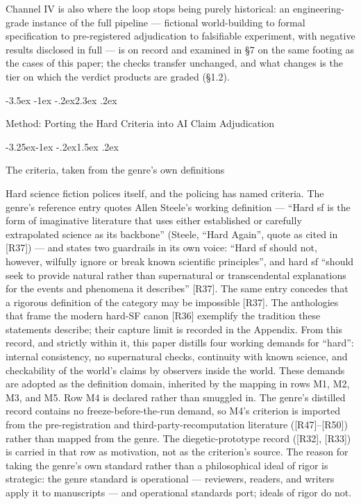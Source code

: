 \documentclass[11pt,a4paper]{article}
\makeatletter
\renewcommand\section{\@startsection{section}{1}{\z@}%
  {-3.5ex \@plus -1ex \@minus -.2ex}{2.3ex \@plus .2ex}%
  {\normalfont\Large\bfseries\raggedright}}
\renewcommand\subsection{\@startsection{subsection}{2}{\z@}%
  {-3.25ex\@plus -1ex \@minus -.2ex}{1.5ex \@plus .2ex}%
  {\normalfont\large\bfseries\raggedright}}
\makeatother
\begin{document}
Channel IV is also where the loop stops being purely historical: an engineering-grade instance of the full pipeline — fictional world-building to formal specification to pre-registered adjudication to falsifiable experiment, with negative results disclosed in full — is on record and examined in §7 on the same footing as the cases of this paper; the checks transfer unchanged, and what changes is the tier on which the verdict products are graded (§1.2).

\section{Method: Porting the Hard Criteria into AI Claim Adjudication}

\subsection{The criteria, taken from the genre's own definitions}

Hard science fiction polices itself, and the policing has named criteria. The genre's reference entry quotes Allen Steele's working definition — ``Hard sf is the form of imaginative literature that uses either established or carefully extrapolated science as its backbone'' (Steele, ``Hard Again'', quote as cited in [R37]) — and states two guardrails in its own voice: ``Hard sf should not, however, wilfully ignore or break known scientific principles'', and hard sf ``should seek to provide natural rather than supernatural or transcendental explanations for the events and phenomena it describes'' [R37]. The same entry concedes that a rigorous definition of the category may be impossible [R37]. The anthologies that frame the modern hard-SF canon [R36] exemplify the tradition these statements describe; their capture limit is recorded in the Appendix. From this record, and strictly within it, this paper distills four working demands for ``hard'': internal consistency, no supernatural checks, continuity with known science, and checkability of the world's claims by observers inside the world. These demands are adopted as the definition domain, inherited by the mapping in rows M1, M2, M3, and M5. Row M4 is declared rather than smuggled in. The genre's distilled record contains no freeze-before-the-run demand, so M4's criterion is imported from the pre-registration and third-party-recomputation literature ([R47]–[R50]) rather than mapped from the genre. The diegetic-prototype record ([R32], [R33]) is carried in that row as motivation, not as the criterion's source. The reason for taking the genre's own standard rather than a philosophical ideal of rigor is strategic: the genre standard is operational — reviewers, readers, and writers apply it to manuscripts — and operational standards port; ideals of rigor do not.
\end{document}
